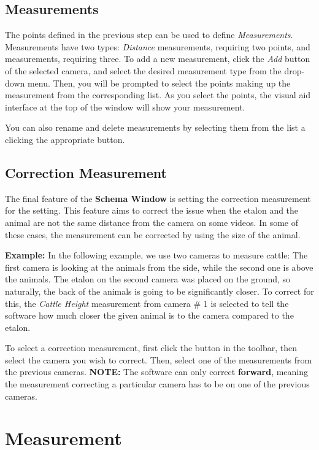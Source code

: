 \documentclass[10pt,a4paper,oneside]{report}             %
\begin{document}
\subsection{Measurements}

The points defined in the previous step can be used to define \textit{Measurements}. Measurements have two types: \textit{Distance} measurements, requiring two points, and  measurements, requiring three. To add a new measurement, click the \textit{Add} button of the selected camera, and select the desired measurement type from the drop-down menu. Then, you will be prompted to select the points making up the measurement from the corresponding list. As you select the points, the visual aid interface at the top of the window will show your measurement. 

You can also rename and delete measurements by selecting them from the list a clicking the appropriate button.

\subsection{Correction Measurement}

The final feature of  the \textbf{Schema Window} is setting the correction measurement for the  setting. This feature aims to correct the issue when the etalon and the animal are not the same distance from the camera on some videos. In some of these cases, the measurement can be corrected by using the size of the animal.

\textbf{Example:} In the following example, we use two cameras to measure cattle: The first camera is looking at the animals from the side, while the second one is above the animals. The etalon on the second camera was placed on the ground, so naturally, the back of the animals is going to be significantly closer. To correct for this, the \textit{Cattle Height} measurement from camera \# 1 is selected to tell the software how much closer the given animal is to the camera compared to the etalon.

To select a correction measurement, first click the button in the toolbar, then select the camera you wish to correct. Then, select one of the measurements from the previous cameras. \textbf{NOTE:} The software can only correct \textbf{forward}, meaning the measurement correcting a particular camera has to be on one of the previous cameras.

\section{Measurement}
\end{document}
